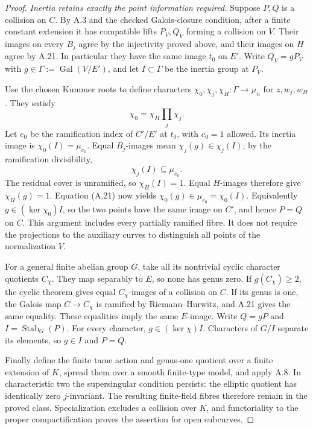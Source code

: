 \begin{proof}
\emph{Inertia retains exactly the point information required.}
Suppose $P,Q$ is a collision on $C$. By A.3 and the checked
Galois-closure condition, after a finite constant extension
it has compatible lifts $P_V,Q_V$ forming a collision on
$V$. Their images on every $B_j$ agree by the injectivity
proved above, and their images on $H$ agree by A.21.
In particular they have the same image $t_0$ on $E'$.
Write $Q_V=gP_V$ with
$g\in\Gamma:=\operatorname{Gal}(V/E')$, and let
$I\subset\Gamma$ be the inertia group at $P_V$.

Use the chosen Kummer roots to define characters
$\chi_0,\chi_j,\chi_H:\Gamma\to\mu_n$ for $z,w_j,w_H$.
They satisfy
\[
 \chi_0=\chi_H\prod_j\chi_j.                              \tag{A.21}
\]
Let $e_0$ be the ramification index of $C'/E'$ at $t_0$,
with $e_0=1$ allowed. Its inertia image is
$\chi_0(I)=\mu_{e_0}$. Equal $B_j$-images mean
$\chi_j(g)\in\chi_j(I)$; by the ramification divisibility,
\[
 \chi_j(I)\subseteq\mu_{e_0}.
\]
The residual cover is unramified, so $\chi_H(I)=1$.
Equal $H$-images therefore give $\chi_H(g)=1$. Equation
(A.21) now yields
$\chi_0(g)\in\mu_{e_0}=\chi_0(I)$. Equivalently
$g\in(\ker\chi_0)I$, so the two points have the same
image on $C'$, and hence $P=Q$ on $C$.
This argument includes every partially ramified fibre.
It does not require the projections to the auxiliary
curves to distinguish all points of the normalization $V$.

For a general finite abelian group $G$, take all its
nontrivial cyclic character quotients $C_\chi$. They map
separably to $E$, so none has genus zero. If
$g(C_\chi)\ge2$, the cyclic theorem gives equal
$C_\chi$-images of a collision on $C$. If its genus is
one, the Galois map $C\to C_\chi$ is ramified by
Riemann--Hurwitz, and A.21 gives the same equality.
These equalities imply the same $E$-image. Write $Q=gP$
and $I=\operatorname{Stab}_G(P)$. For every character,
$g\in(\ker\chi)I$. Characters of $G/I$ separate its
elements, so $g\in I$ and $P=Q$.

Finally define the finite tame action and genus-one quotient
over a finite extension of $K$, spread them over a smooth
finite-type model, and apply A.8. In characteristic two
the supersingular condition persists: the elliptic quotient
has identically zero $j$-invariant. The resulting finite-field
fibres therefore remain in the proved class. Specialization
excludes a collision over $K$, and functoriality to the
proper compactification proves the assertion for open
subcurves.
\end{proof}


